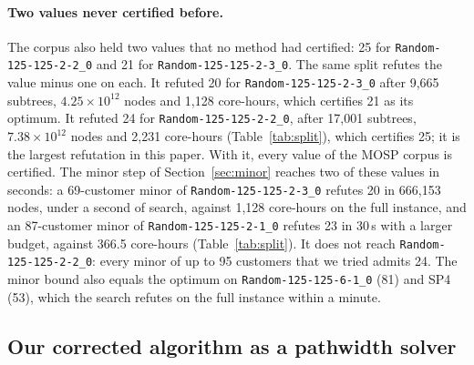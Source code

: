 \begin{table}[t]
\centering\small
\caption{The root split on graphs. The refutation of width minus one by one
core with the engine's default memo limit (four million states), by one core
with the limit raised to 64 million states (1.1~GB), and by the split on
sixteen workers with a default memo per task: nodes and wall seconds, the
split's summed task CPU seconds in brackets, and the two one-core times
divided by the split's. The split's node count is identical at every worker
count. Same engine, same rules, nice~19, other work on the machine.}
\label{tab:splitscale}
\resizebox{\linewidth}{!}{}
\end{table}

\paragraph{Two values never certified before.} The corpus also held two values that
no method had certified: 25 for \texttt{Random-125-125-2-2\_0} and 21 for
\texttt{Random-125-125-2-3\_0}. The same split refutes the value minus one on
each. It refuted 20 for \texttt{Random-125-125-2-3\_0} after
9,665 subtrees, $4.25\times10^{12}$ nodes and 1,128 core-hours, which
certifies 21 as its optimum. It refuted 24 for
\texttt{Random-125-125-2-2\_0}, after 17,001 subtrees,
$7.38\times10^{12}$ nodes and 2,231 core-hours (Table~\ref{tab:split}), which
certifies 25; it is the largest refutation in this paper. With it, every value
of the MOSP corpus is certified. The minor step of Section~\ref{sec:minor}
reaches two of these values in seconds: a 69-customer minor of \texttt{Random-125-125-2-3\_0} refutes 20 in 666,153
nodes, under a second of search, against
1,128 core-hours on the full instance, and an 87-customer minor of
\texttt{Random-125-125-2-1\_0} refutes 23 in 30\,s with a larger budget, against 366.5 core-hours
(Table~\ref{tab:split}). It does not reach
\texttt{Random-125-125-2-2\_0}: every minor of up to 95 customers that we tried admits 24. The minor bound
also equals the optimum on \texttt{Random-125-125-6-1\_0} (81) and SP4 (53),
which the search refutes on the full instance within a minute.

\subsection{Our corrected algorithm as a pathwidth solver}
\label{sec:pwsolver}

